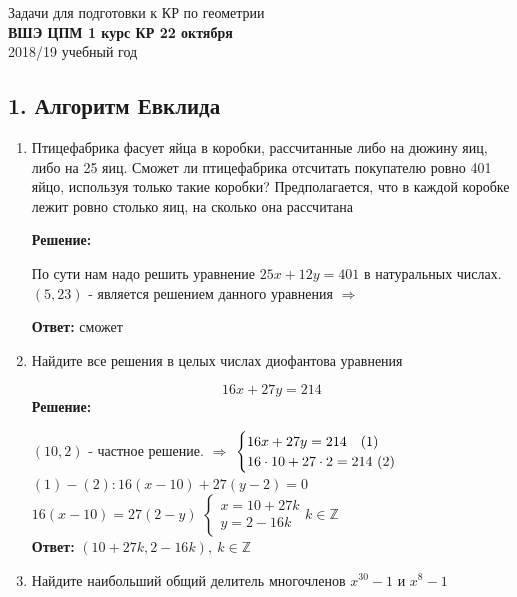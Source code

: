 \documentclass[]{book}
\theoremstyle{definition}
\newcommand{\bb}[1]{\mathbb{#1}}
\begin{document}
\begin{center}
{\Large Задачи для подготовки к КР по геометрии}\\
\textbf{ВШЭ ЦПМ 1 курс КР 22 октября}\\ %
2018/19 учебный год %
\end{center}


\subsection*{1. Алгоритм Евклида}

\begin{enumerate}


\item Птицефабрика фасует яйца в коробки, рассчитанные либо на дюжину
яиц, либо на 25 яиц. Сможет ли птицефабрика отсчитать покупателю ровно 401
яйцо, используя только такие коробки? Предполагается, что в каждой коробке лежит
ровно столько яиц, на сколько она рассчитана

\textbf{Решение:}

По сути нам надо решить уравнение $25x + 12y = 401$ в натуральных числах. $(5, 23)$ - является решением данного уравнения $\Longrightarrow$ 

\textbf{Ответ: } сможет

\item Найдите все решения в целых числах диофантова уравнения

$$16x + 27y = 214$$
\textbf{Решение:}

$(10,2)$ - частное решение. $\Longrightarrow$
$
\begin{cases}
   16x + 27y = 214 \quad (1) \\
   16\cdot 10 + 27\cdot 2 = 214\ (2)
 \end{cases}\\
$
$(1) - (2): 16(x-10) + 27(y-2) = 0$\\
$16(x-10) = 27(2-y)$
$
\begin{cases}
   x = 10 + 27k \\
   y = 2 - 16k
\end{cases}
k\in\bb{Z}$ \\

\textbf{Ответ: } $(10+27k, 2-16k),\: k\in\bb{Z}$


\item Найдите наибольший общий делитель многочленов $x^{30} - 1$ и $x^8 - 1$


\end{enumerate}
\end{document}
